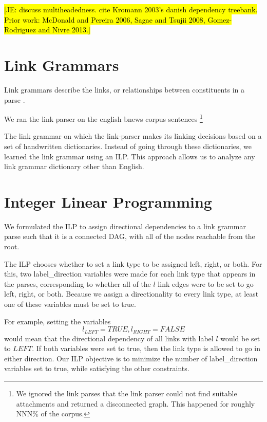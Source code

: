 \documentclass[11pt]{article}
\newcommand{\Note}[1]{}
\renewcommand{\Note}[1]{\hl{[#1]}}  %
\newcommand{\NoteSigned}[3]{{\sethlcolor{#2}\Note{#1: #3}}}
\newcommand{\NoteJE}[1]{\NoteSigned{JE}{LightBlue}{#1}}
\begin{document}
\NoteJE{discuss multiheadedness.  cite Kromann 2003's danish
  dependency treebank.  Prior work: McDonald and Pereira 2006, Sagae
  and Tsujii 2008, Gomez-Rodriguez and Nivre 2013.}


\section{Link Grammars}

Link grammars describe the links, or relationships between constituents in a parse \cite{SleatorTemperly91}. 


We ran the link parser on the english bnews corpus sentences \footnote{We ignored the link parses that the link parser could not find suitable attachments and returned a disconnected graph. This happened for roughly NNN\% of the corpus.}

The link grammar on which the link-parser makes its linking decisions based on a set of handwritten dictionaries. Instead of going through these dictionaries, we learned the link grammar using an ILP. This approach allows us to analyze any link grammar dictionary other than English.


\section{Integer Linear Programming}

We formulated the ILP to assign directional dependencies to a link grammar parse such that it is a connected DAG, with all of the nodes reachable from the root.

The ILP chooses whether to set a link type to be assigned left, right, or both. For this, two label\_direction variables were made for each link type that appears in the parses, corresponding to whether all of the $l$ link edges were to be set to go left, right, or both. Because we assign a directionality to every link type, at least one of these variables must be set to true.

For example, setting the variables $$l_{LEFT} = TRUE, l_{RIGHT} = FALSE$$ would mean that the directional dependency of all links with label $l$ would be set to $LEFT$. If both variables were set to true, then the link type is allowed to go in either direction. Our ILP objective is to minimize the number of label\_direction variables set to true, while satisfying the other constraints.
\end{document}
